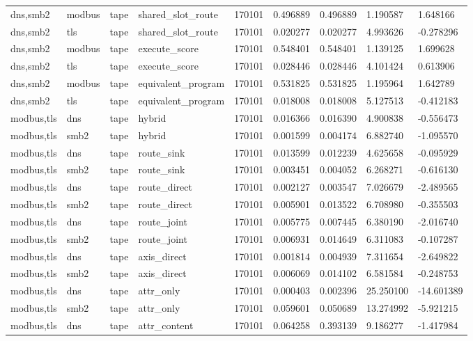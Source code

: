 \begin{tabular}{lllllllll}
dns,smb2 & modbus & tape & shared\_slot\_route & 170101 & 0.496889 & 0.496889 & 1.190587 & 1.648166 \\
dns,smb2 & tls & tape & shared\_slot\_route & 170101 & 0.020277 & 0.020277 & 4.993626 & -0.278296 \\
dns,smb2 & modbus & tape & execute\_score & 170101 & 0.548401 & 0.548401 & 1.139125 & 1.699628 \\
dns,smb2 & tls & tape & execute\_score & 170101 & 0.028446 & 0.028446 & 4.101424 & 0.613906 \\
dns,smb2 & modbus & tape & equivalent\_program & 170101 & 0.531825 & 0.531825 & 1.195964 & 1.642789 \\
dns,smb2 & tls & tape & equivalent\_program & 170101 & 0.018008 & 0.018008 & 5.127513 & -0.412183 \\
modbus,tls & dns & tape & hybrid & 170101 & 0.016366 & 0.016390 & 4.900838 & -0.556473 \\
modbus,tls & smb2 & tape & hybrid & 170101 & 0.001599 & 0.004174 & 6.882740 & -1.095570 \\
modbus,tls & dns & tape & route\_sink & 170101 & 0.013599 & 0.012239 & 4.625658 & -0.095929 \\
modbus,tls & smb2 & tape & route\_sink & 170101 & 0.003451 & 0.004052 & 6.268271 & -0.616130 \\
modbus,tls & dns & tape & route\_direct & 170101 & 0.002127 & 0.003547 & 7.026679 & -2.489565 \\
modbus,tls & smb2 & tape & route\_direct & 170101 & 0.005901 & 0.013522 & 6.708980 & -0.355503 \\
modbus,tls & dns & tape & route\_joint & 170101 & 0.005775 & 0.007445 & 6.380190 & -2.016740 \\
modbus,tls & smb2 & tape & route\_joint & 170101 & 0.006931 & 0.014649 & 6.311083 & -0.107287 \\
modbus,tls & dns & tape & axis\_direct & 170101 & 0.001814 & 0.004939 & 7.311654 & -2.649822 \\
modbus,tls & smb2 & tape & axis\_direct & 170101 & 0.006069 & 0.014102 & 6.581584 & -0.248753 \\
modbus,tls & dns & tape & attr\_only & 170101 & 0.000403 & 0.002396 & 25.250100 & -14.601389 \\
modbus,tls & smb2 & tape & attr\_only & 170101 & 0.059601 & 0.050689 & 13.274992 & -5.921215 \\
modbus,tls & dns & tape & attr\_content & 170101 & 0.064258 & 0.393139 & 9.186277 & -1.417984 \\

\end{tabular}
